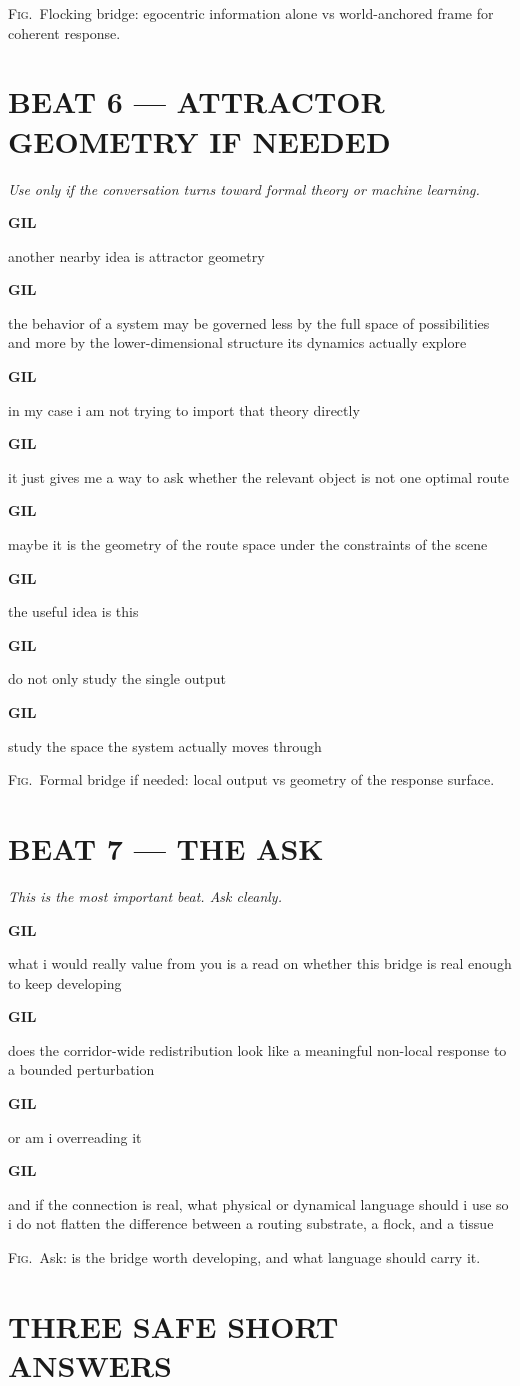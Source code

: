 \documentclass[11pt,letterpaper]{article}
\newcommand{\gil}[1]{\par\smallskip\textbf{GIL}\par #1}
\newcommand{\context}[1]{\textit{#1}\par\smallskip}
\newcommand{\figdesc}[1]{\par\smallskip\textsc{Fig.}\ #1\par}
\begin{document}
\figdesc{Flocking bridge: egocentric information alone vs world-anchored frame for coherent response.}

\section*{BEAT 6 --- ATTRACTOR GEOMETRY IF NEEDED}

\context{Use only if the conversation turns toward formal theory or machine learning.}

\gil{another nearby idea is attractor geometry}

\gil{the behavior of a system may be governed less by the full space of possibilities and more by the lower-dimensional structure its dynamics actually explore}

\gil{in my case i am not trying to import that theory directly}

\gil{it just gives me a way to ask whether the relevant object is not one optimal route}

\gil{maybe it is the geometry of the route space under the constraints of the scene}

\gil{the useful idea is this}

\gil{do not only study the single output}

\gil{study the space the system actually moves through}

\figdesc{Formal bridge if needed: local output vs geometry of the response surface.}

\section*{BEAT 7 --- THE ASK}

\context{This is the most important beat. Ask cleanly.}

\gil{what i would really value from you is a read on whether this bridge is real enough to keep developing}

\gil{does the corridor-wide redistribution look like a meaningful non-local response to a bounded perturbation}

\gil{or am i overreading it}

\gil{and if the connection is real, what physical or dynamical language should i use so i do not flatten the difference between a routing substrate, a flock, and a tissue}

\figdesc{Ask: is the bridge worth developing, and what language should carry it.}

\section*{THREE SAFE SHORT ANSWERS}
\end{document}
